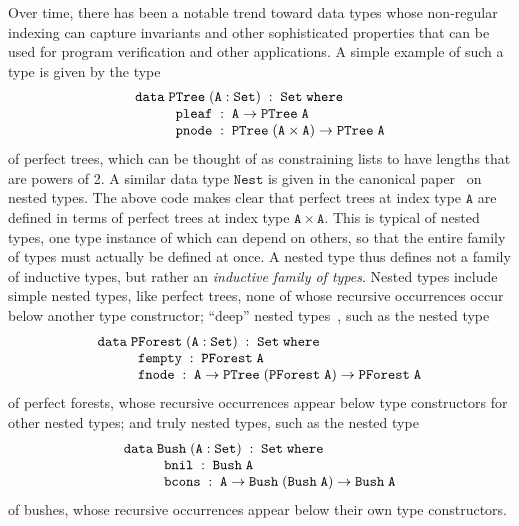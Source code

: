 \documentclass{lmcs}
\theoremstyle{plain}\newtheorem{satz}[thm]{Satz}
\begin{document}
Over time, there has been a notable trend toward data types whose
non-regular indexing can capture invariants and other sophisticated
properties that can be used for program verification and other
applications.  A simple example of such a type is given by the type 
\[\begin{array}{l}
\mathtt{data\; PTree\;(A : Set)\;:\;Set\;where}\\
\hspace*{0.4in}\mathtt{pleaf\;:\;A \rightarrow PTree\;A}\\
\hspace*{0.4in}\mathtt{pnode\;:\;PTree\;(A \times A) \rightarrow PTree\;A}
\end{array}\]
\noindent
of perfect trees, which can be thought of as constraining lists to
have lengths that are powers of 2.  A similar data type
$\mathtt{Nest}$ is given in the canonical paper~\cite{bm98} on nested
types. The above code makes clear that perfect trees at index type
$\mathtt{A}$ are defined in terms of perfect trees at index type
$\mathtt{A \times A}$. This is typical of nested types, one type
instance of which can depend on others, so that the entire family of
types must actually be defined at once. A nested type thus defines not
a family of inductive types, but rather an {\em inductive family of
  types}.  Nested types include simple nested types, like perfect
trees, none of whose recursive occurrences occur below another type
constructor; ``deep'' nested types~\cite{jp20}, such as the nested
type
\[\begin{array}{l}
\mathtt{data\; PForest\;(A : Set)\;:\;Set\;where}\\
\hspace*{0.4in}\mathtt{fempty\;:\;PForest\;A}\\
\hspace*{0.4in}\mathtt{fnode\;:\; A \rightarrow PTree\;(PForest\;A) \to
PForest\;A}
\end{array}\]
\hspace{-0.04in}of perfect forests, whose recursive occurrences appear
below type constructors for other nested types; and truly nested
types, such as the nested type 
\[\begin{array}{l}
\mathtt{data\; Bush\;(A : Set)\;:\;Set\;where}\\
\hspace*{0.4in}\mathtt{bnil\;:\; Bush\;A}\\
\hspace*{0.4in}\mathtt{bcons\;:\;A \rightarrow Bush\;(Bush \; A)
  \rightarrow Bush\;A} 
\end{array}\]
\hspace{-0.04in}of bushes, whose recursive occurrences appear below
their own type constructors.
\end{document}
